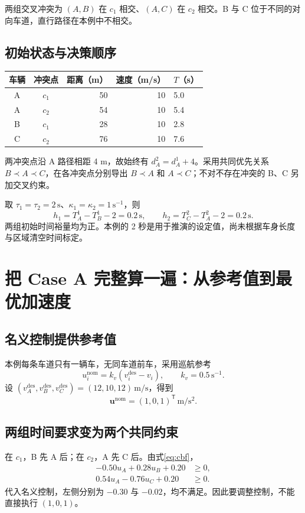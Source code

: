 \documentclass[UTF8,fontset=fandol,11pt,a4paper]{ctexart}
\newcommand{\nom}{\mathrm{nom}}
\newcommand{\unit}[1]{\,\mathrm{#1}}
\begin{document}
两组交叉冲突为 $(A,B)$ 在 $c_1$ 相交、$(A,C)$ 在 $c_2$ 相交。B 与 C 位于不同的对向车道，直行路径在本例中不相交。

\subsection{初始状态与决策顺序}
\begin{center}
\begin{tabular}{ccrrl}
\toprule
车辆 & 冲突点 & 距离（m） & 速度（m/s） & $T$（s）\\\midrule
A & $c_1$ & 50 & 10 & 5.0\\
A & $c_2$ & 54 & 10 & 5.4\\
B & $c_1$ & 28 & 10 & 2.8\\
C & $c_2$ & 76 & 10 & 7.6\\\bottomrule
\end{tabular}
\end{center}
两冲突点沿 A 路径相距 4 m，故始终有 $d_A^2=d_A^1+4$。采用共同优先关系 $B\prec A\prec C$，在各冲突点分别导出 $B\prec A$ 和 $A\prec C$；不对不存在冲突的 B、C 另加交叉约束。

取 $\tau_1=\tau_2=2\unit{s}$、$\kappa_1=\kappa_2=1\unit{s^{-1}}$，则
\[
h_1=T_A^1-T_B^1-2=0.2\unit{s},\qquad
h_2=T_C^2-T_A^2-2=0.2\unit{s}.
\]
两组初始时间裕量均为正。本例的 2 秒是用于推演的设定值，尚未根据车身长度与区域清空时间标定。

\newpage
\section{把 Case A 完整算一遍：从参考值到最优加速度}
\subsection{名义控制提供参考值}
本例每条车道只有一辆车，无同车道前车，采用巡航参考
\[
u_i^{\nom}=k_v(v_i^{\mathrm{des}}-v_i),\qquad k_v=0.5\unit{s^{-1}}.
\]
设 $(v_A^{\mathrm{des}},v_B^{\mathrm{des}},v_C^{\mathrm{des}})=(12,10,12)\unit{m/s}$，得到
\[
\mathbf u^{\nom}=(1,0,1)^{\mathsf T}\unit{m/s^2}.
\]
\subsection{两组时间要求变为两个共同约束}
在 $c_1$，B 先 A 后；在 $c_2$，A 先 C 后。由式\eqref{eq:cbf}，
\begin{align}
-0.50u_A+0.28u_B+0.20&\geq0,\label{eq:first}\\
0.54u_A-0.76u_C+0.20&\geq0.\label{eq:second}
\end{align}
代入名义控制，左侧分别为 $-0.30$ 与 $-0.02$，均不满足。因此要调整控制，不能直接执行 $(1,0,1)$。
\end{document}
